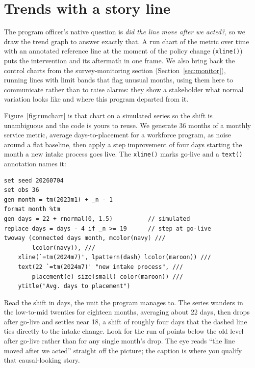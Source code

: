 \section{Trends with a story line}
The program officer's native question is \emph{did the line move after we acted?}, so we draw the trend graph to answer exactly that. A run chart of the metric over time with an annotated reference line at the moment of the policy change (\texttt{xline()}) puts the intervention and its aftermath in one frame. We also bring back the control charts from the survey-monitoring section (Section~\ref{sec:monitor}), running lines with limit bands that flag unusual months, using them here to communicate rather than to raise alarms: they show a stakeholder what normal variation looks like and where this program departed from it.

Figure~\ref{fig:runchart} is that chart on a simulated series so the shift is unambiguous and the code is yours to reuse. We generate 36 months of a monthly service metric, average days-to-placement for a workforce program, as noise around a flat baseline, then apply a step improvement of four days starting the month a new intake process goes live. The \texttt{xline()} marks go-live and a \texttt{text()} annotation names it:
\par
{\footnotesize
\begin{verbatim}
set seed 20260704
set obs 36
gen month = tm(2023m1) + _n - 1
format month %tm
gen days = 22 + rnormal(0, 1.5)          // simulated
replace days = days - 4 if _n >= 19      // step at go-live
twoway (connected days month, mcolor(navy) ///
        lcolor(navy)), ///
    xline(`=tm(2024m7)', lpattern(dash) lcolor(maroon)) ///
    text(22 `=tm(2024m7)' "new intake process", ///
        placement(e) size(small) color(maroon)) ///
    ytitle("Avg. days to placement")
\end{verbatim}
}
Read the shift in days, the unit the program manages to. The series wanders in the low-to-mid twenties for eighteen months, averaging about 22 days, then drops after go-live and settles near 18, a shift of roughly four days that the dashed line ties directly to the intake change. Look for the run of points below the old level after go-live rather than for any single month's drop. The eye reads \enquote{the line moved after we acted} straight off the picture; the caption is where you qualify that causal-looking story.


